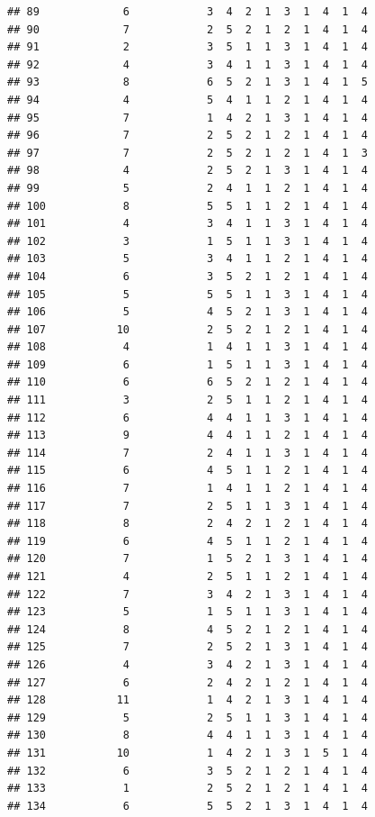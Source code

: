 \documentclass[12pt,]{krantz}
\theoremstyle{definition}
\theoremstyle{definition}
\theoremstyle{remark}
\begin{document}
\begin{verbatim}
## 89             6            3  4  2  1  3  1  4  1  4
## 90             7            2  5  2  1  2  1  4  1  4
## 91             2            3  5  1  1  3  1  4  1  4
## 92             4            3  4  1  1  3  1  4  1  4
## 93             8            6  5  2  1  3  1  4  1  5
## 94             4            5  4  1  1  2  1  4  1  4
## 95             7            1  4  2  1  3  1  4  1  4
## 96             7            2  5  2  1  2  1  4  1  4
## 97             7            2  5  2  1  2  1  4  1  3
## 98             4            2  5  2  1  3  1  4  1  4
## 99             5            2  4  1  1  2  1  4  1  4
## 100            8            5  5  1  1  2  1  4  1  4
## 101            4            3  4  1  1  3  1  4  1  4
## 102            3            1  5  1  1  3  1  4  1  4
## 103            5            3  4  1  1  2  1  4  1  4
## 104            6            3  5  2  1  2  1  4  1  4
## 105            5            5  5  1  1  3  1  4  1  4
## 106            5            4  5  2  1  3  1  4  1  4
## 107           10            2  5  2  1  2  1  4  1  4
## 108            4            1  4  1  1  3  1  4  1  4
## 109            6            1  5  1  1  3  1  4  1  4
## 110            6            6  5  2  1  2  1  4  1  4
## 111            3            2  5  1  1  2  1  4  1  4
## 112            6            4  4  1  1  3  1  4  1  4
## 113            9            4  4  1  1  2  1  4  1  4
## 114            7            2  4  1  1  3  1  4  1  4
## 115            6            4  5  1  1  2  1  4  1  4
## 116            7            1  4  1  1  2  1  4  1  4
## 117            7            2  5  1  1  3  1  4  1  4
## 118            8            2  4  2  1  2  1  4  1  4
## 119            6            4  5  1  1  2  1  4  1  4
## 120            7            1  5  2  1  3  1  4  1  4
## 121            4            2  5  1  1  2  1  4  1  4
## 122            7            3  4  2  1  3  1  4  1  4
## 123            5            1  5  1  1  3  1  4  1  4
## 124            8            4  5  2  1  2  1  4  1  4
## 125            7            2  5  2  1  3  1  4  1  4
## 126            4            3  4  2  1  3  1  4  1  4
## 127            6            2  4  2  1  2  1  4  1  4
## 128           11            1  4  2  1  3  1  4  1  4
## 129            5            2  5  1  1  3  1  4  1  4
## 130            8            4  4  1  1  3  1  4  1  4
## 131           10            1  4  2  1  3  1  5  1  4
## 132            6            3  5  2  1  2  1  4  1  4
## 133            1            2  5  2  1  2  1  4  1  4
## 134            6            5  5  2  1  3  1  4  1  4

\end{verbatim}
\end{document}
